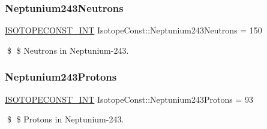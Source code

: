 \subsubsection{\texorpdfstring{Neptunium243\+Neutrons}{Neptunium243Neutrons}}
{\footnotesize\ttfamily \mbox{\hyperlink{group___isotope_const-_macros_ga5f18360b3e99483a35c32d789e62621c}{I\+S\+O\+T\+O\+P\+E\+C\+O\+N\+S\+T\+\_\+\+I\+NT}} Isotope\+Const\+::\+Neptunium243\+Neutrons = 150}

\$ \$ Neutrons in Neptunium-\/243. \mbox{\label{group___isotope_const-_neptunium-_np243_ga0a34100f74cb1294c852ee8430588ea0}} 
\subsubsection{\texorpdfstring{Neptunium243\+Protons}{Neptunium243Protons}}
{\footnotesize\ttfamily \mbox{\hyperlink{group___isotope_const-_macros_ga5f18360b3e99483a35c32d789e62621c}{I\+S\+O\+T\+O\+P\+E\+C\+O\+N\+S\+T\+\_\+\+I\+NT}} Isotope\+Const\+::\+Neptunium243\+Protons = 93}

\$ \$ Protons in Neptunium-\/243. 